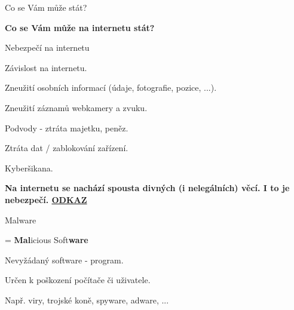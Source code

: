 \documentclass[aspectratio=1610]{beamer}
\begin{document}
\begin{frame}{Co se Vám může stát?}
    \begin{cardTiny}
        \begin{center}
            \textbf{Co se Vám může na internetu stát?}
        \end{center}
    \end{cardTiny}
\end{frame}

\begin{frame}{Nebezpečí na internetu}
    \begin{cardTiny}
        \begin{flushleft}
            Závislost na internetu.

            Zneužití osobních informací (údaje, fotografie, pozice, ...).

            Zneužití záznamů webkamery a zvuku.

            Podvody - ztráta majetku, peněz.

            Ztráta dat / zablokování zařízení.
        
            Kyberšikana.
        \end{flushleft}
    \end{cardTiny}
    \begin{cardTiny}
        \begin{flushleft}
            \textbf{Na internetu se nachází spousta divných (i nelegálních) věcí. I to je nebezpečí. \href{https://www.youtube.com/watch?v=dQw4w9WgXcQ}{ODKAZ}}
        \end{flushleft}
    \end{cardTiny}
\end{frame}

\begin{frame}{Malware}
    \begin{cardTiny}
        \begin{flushleft}
            = \textbf{Mal}icious Soft\textbf{ware}

            \vspace{2ex}
            Nevyžádaný software - program.

            Určen k poškození počítače či uživatele.

            \vspace{2ex}        
            Např. viry, trojské koně, spyware, adware, ...
        \end{flushleft}
    \end{cardTiny}
\end{frame}
\end{document}
